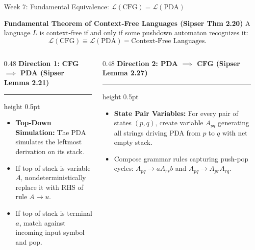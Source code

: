 \documentclass[aspectratio=169, 10pt]{beamer}
\newcommand{\colheader}[1]{%
  {\noindent\footnotesize\bfseries\color{gimpanavy}#1}%
  \vspace{0.03cm}%
  {\color{gimpanavy!30}\hrule height 0.5pt}%
  \vspace{0.08cm}%
}
\begin{document}
\begin{frame}{Week 7: Fundamental Equivalence: $\mathcal{L}(\text{CFG}) = \mathcal{L}(\text{PDA})$}
  \begin{tcolorbox}[conceptcard]
    {\bfseries\footnotesize\color{gimpanavy} Fundamental Theorem of Context-Free Languages (Sipser Thm 2.20)}
    \vspace{0.04cm}
    \footnotesize
    A language $L$ is context-free if and only if some pushdown automaton recognizes it:
    $$\mathcal{L}(\text{CFG}) \equiv \mathcal{L}(\text{PDA}) = \text{Context-Free Languages}.$$
  \end{tcolorbox}

  \vspace{0.06cm}
  \begin{columns}[T]
    \begin{column}{0.48\textwidth}
      \colheader{Direction 1: CFG $\implies$ PDA (Sipser Lemma 2.21)}
      \begin{tcolorbox}[examplecard, top=3pt, bottom=3pt]
        \begin{itemize}\setlength{\itemsep}{2.5pt}\scriptsize
          \item \textbf{Top-Down Simulation:} The PDA simulates the leftmost derivation on its stack.
          \item If top of stack is variable $A$, nondeterministically replace it with RHS of rule $A \to u$.
          \item If top of stack is terminal $a$, match against incoming input symbol and pop.
        \end{itemize}
      \end{tcolorbox}
    \end{column}

    \hfill

    \begin{column}{0.48\textwidth}
      \colheader{Direction 2: PDA $\implies$ CFG (Sipser Lemma 2.27)}
      \begin{tcolorbox}[conceptcard, top=3pt, bottom=3pt]
        \begin{itemize}\setlength{\itemsep}{2.5pt}\scriptsize
          \item \textbf{State Pair Variables:} For every pair of states $(p, q)$, create variable $A_{pq}$ generating all strings driving PDA from $p$ to $q$ with net empty stack.
          \item Compose grammar rules capturing push-pop cycles: $A_{pq} \to a A_{rs} b$ and $A_{pq} \to A_{pr} A_{rq}$.
        \end{itemize}
      \end{tcolorbox}
    \end{column}
  \end{columns}
  

\end{frame}
\end{document}

